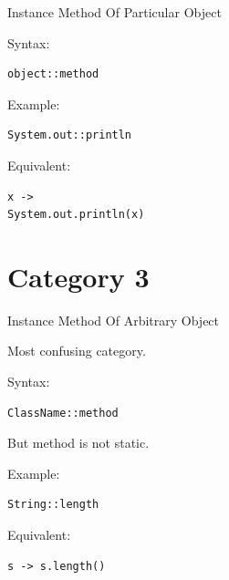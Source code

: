 \documentclass[11pt,a4paper]{book}
\begin{document}
Instance Method Of
Particular Object


Syntax:

\begin{verbatim} 
object::method
\end{verbatim}


Example:

\begin{verbatim} 
System.out::println
\end{verbatim}


Equivalent:

\begin{verbatim} 
x ->
System.out.println(x)
\end{verbatim}


\section{Category 3}

Instance Method Of
Arbitrary Object


Most confusing category.


Syntax:

\begin{verbatim} 
ClassName::method
\end{verbatim}


But method is not static.


Example:

\begin{verbatim} 
String::length
\end{verbatim}


Equivalent:

\begin{verbatim} 
s -> s.length()
\end{verbatim}
\end{document}
